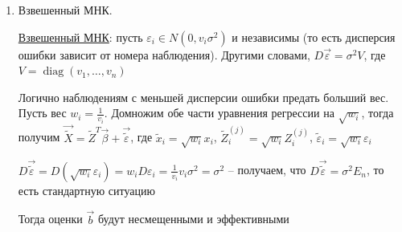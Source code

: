 \begin{enumerate}
\begin{enumerate}[label*=\asbuk*) ]
        \begin{MyTheorem}
            \Ths Если $H_0 : \beta_i = 0$ верна, то $T_i = \frac{b_i}{S_{b_i}} \in T_{n - k - 1}$
        \end{MyTheorem}

        
        Получаем критерий, называемый T-тестом: $t_\alpha$ -- квантиль двухстороннего распределения Стьюдента $|T_{n - k - 1}|$ уровня значимости $\alpha$

        $\begin{cases}
            H_0 : \beta_i = 0, & \text{ если } |T_i| < t_\alpha \\ 
            H_0 : \beta_i \neq 0, & \text{ если } |T_i| \geq t_\alpha
        \end{cases}$

        \Nota T-тест служит для отсева несущественных факторов из модели при условии, что все другие факторы включены в модель

        \Notas При мультиколлинеарности возможно, что уравнение имеет высокую значимость, а большинство коэффициентов не проходит T-тест 

        \Notas При применении T-теста убираем только один фактор, далее строим новую модель и для нее опять проводим T-тест. Удаление 2 факторов может привести к неопределенным результатам
    \end{enumerate}

    \item Взвешенный МНК.

    \hyperlink{weighted_mls}{Взвешенный МНК}: пусть $\varepsilon_i \in N(0, v_i \sigma^2)$ и независимы (то есть дисперсия ошибки зависит от номера наблюдения). Другими словами, $D \vec \varepsilon = \sigma^2 V$, где $V = \operatorname{diag} (v_1, \dots, v_n)$

    Логично наблюдениям с меньшей дисперсии ошибки предать больший вес. Пусть вес $w_i = \frac{1}{v_i}$. Домножим обе части уравнения регрессии на $\sqrt{w_i}$, тогда получим $\vec \tilde{X} = \tilde Z^T \vec \beta + \vec \tilde{\varepsilon}$, где $\tilde x_i=  \sqrt{w_i} x_i$, $\tilde Z^{(j)}_i = \sqrt{w_i} Z^{(j)}_i$, $\tilde \varepsilon_i = \sqrt{w_i} \varepsilon_i$

    $D \vec \tilde{\varepsilon} = D(\sqrt{w_i} \varepsilon_i) = w_i D \varepsilon_i = \frac{1}{v_i} v_i \sigma^2 = \sigma^2$ -- получаем, что $D \vec \tilde{\varepsilon} = \sigma^2 E_n$, то есть стандартную ситуацию

    Тогда оценки $\vec b$ будут несмещенными и эффективными


\end{enumerate}
